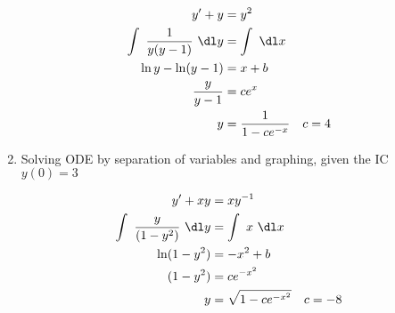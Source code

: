 \begin{enumerate}
          \begin{align}
              y' + y                          & = y^{2}                          \\
              \int\ \frac{1}{y(y - 1)}\ \dl y & =  \int\ \dl x                   \\
              \ln y - \ln (y-1)               & = x + b                          \\
              \frac{y}{y-1}                   & = ce^{x}                         \\
              y                               & = \frac{1}{1 - ce^{-x}} & c & =4
          \end{align}

          \begin{figure}[H]
              \centering
          \end{figure}

    \item Solving ODE by separation of variables and graphing, given the IC $ y(0) = 3 $

          \begin{align}
              y' + xy                            & = xy^{-1}                           \\
              \int\ \frac{y}{(1 - y^{2})}\ \dl y & =  \int\ x\ \dl x                   \\
              \ln (1 - y^{2})                    & = -x^{2} + b                        \\
              (1 - y^{2})                        & = ce^{-x^{2}}                       \\
              y                                  & = \sqrt{1 - ce^{-x^{2}}} & c & = -8
          \end{align}


\end{enumerate}
